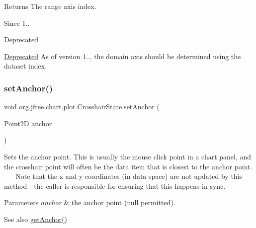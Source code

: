 \begin{DoxyReturn}{Returns}
The range axis index.
\end{DoxyReturn}
\begin{DoxySince}{Since}
1..
\end{DoxySince}
\begin{DoxyRefDesc}{Deprecated}
\item[\mbox{\hyperlink{deprecated__deprecated000061}{Deprecated}}]As of version 1.., the domain axis should be determined using the dataset index. \end{DoxyRefDesc}
\mbox{\label{classorg_1_1jfree_1_1chart_1_1plot_1_1_crosshair_state_a138d7cded9ca3a55a8faf9a313fd0e83}} 
\subsubsection{\texorpdfstring{set\+Anchor()}{setAnchor()}}
{\footnotesize\ttfamily void org.\+jfree.\+chart.\+plot.\+Crosshair\+State.\+set\+Anchor (\begin{DoxyParamCaption}\item[{Point2D}]{anchor }\end{DoxyParamCaption})}

Sets the anchor point. This is usually the mouse click point in a chart panel, and the crosshair point will often be the data item that is closest to the anchor point. ~\newline
~\newline
 Note that the x and y coordinates (in data space) are not updated by this method -\/ the caller is responsible for ensuring that this happens in sync.


\begin{DoxyParams}{Parameters}
{\em anchor} & the anchor point ({\ttfamily null} permitted).\\
\hline
\end{DoxyParams}
\begin{DoxySeeAlso}{See also}
\mbox{\hyperlink{classorg_1_1jfree_1_1chart_1_1plot_1_1_crosshair_state_a7f39f49282ff35721eab0e18736c4b43}{get\+Anchor()}} 
\end{DoxySeeAlso}
\mbox{\label{classorg_1_1jfree_1_1chart_1_1plot_1_1_crosshair_state_a90acee2b91f48509dbaab85288632e25}} 
